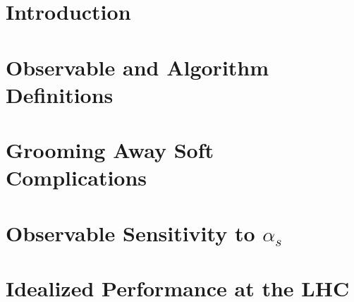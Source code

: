 \documentclass[11pt,letterpaper]{article}
\begin{document}
\maketitle

\section{Introduction}



\section{Observable and Algorithm Definitions}
\label{sec:definitions}



\section{Grooming Away Soft Complications}
\label{sec:softcomplications}



\section{Observable Sensitivity to $\alpha_s$}
\label{sec:jetmass}



\section{Idealized Performance at the LHC}
\label{sec:ben_study}




%

\end{document}
